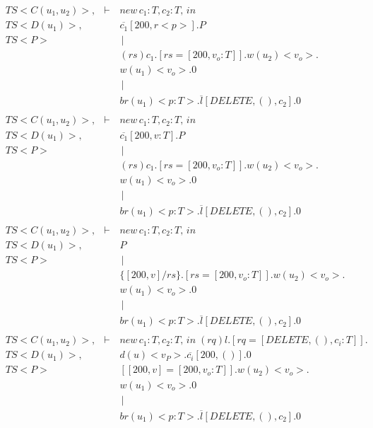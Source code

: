 \begin{eqnarray*}
 \ TS<C(u_1,u_2)>, &\vdash\,& new\,c_1:T,c_2:T,\,in\; \\
 \ TS<D(u_1)>,     &        & \overline{c_1}[200,r<p>].P         \\
 \ TS<P>            &        &    \,|\,      \\
 \               &        &  (rs)c_1.[rs = [200,v_o:T]].w(u_2)<v_o>. \\
 \               &        & w(u_1)<v_o>.0        \\
 \               &        &    \,|\,      \\
 \               &        &  br(u_1)<p:T>.\overline{l}[DELETE,(),c_2].0 \\
 \               &        &          \\
 \ TS<C(u_1,u_2)>, &\vdash\,& new\,c_1:T,c_2:T,\,in\;  \\
 \ TS<D(u_1)>,     &        & \overline{c_1}[200,v:T].P         \\
 \ TS<P>            &        &    \,|\,      \\
 \               &        &  (rs)c_1.[rs = [200,v_o:T]].w(u_2)<v_o>. \\
 \               &        & w(u_1)<v_o>.0        \\
 \               &        &    \,|\,      \\
 \               &        &  br(u_1)<p:T>.\overline{l}[DELETE,(),c_2].0 \\
 \               &        &          \\
 \ TS<C(u_1,u_2)>, &\vdash\,& new\,c_1:T,c_2:T,\,in\; \\
 \ TS<D(u_1)>,   &        & P        \\
 \ TS<P>         &        &    \,|\,      \\
 \               &        & \{[200,v] / rs\}.[rs = [200,v_o:T]].w(u_2)<v_o>. \\
 \               &        & w(u_1)<v_o>.0        \\
 \               &        &    \,|\,      \\
 \               &        &  br(u_1)<p:T>.\overline{l}[DELETE,(),c_2].0 \\
 \               &        &          \\
 \ TS<C(u_1,u_2)>, &\vdash\,& new\,c_1:T,c_2:T,\,in\; (rq)l.[rq = [DELETE,(),c_i:T]].\\
 \ TS<D(u_1)>,   &        & d(u)<v_{P}>.\overline{c_i}[200,()].0         \\
 \ TS<P>              &        & [[200,v] = [200,v_o:T]].w(u_2)<v_o>. \\
 \               &        & w(u_1)<v_o>.0        \\
 \               &        &    \,|\,      \\
 \               &        &  br(u_1)<p:T>.\overline{l}[DELETE,(),c_2].0 \\
 \               &        &          \\
\end{eqnarray*}
